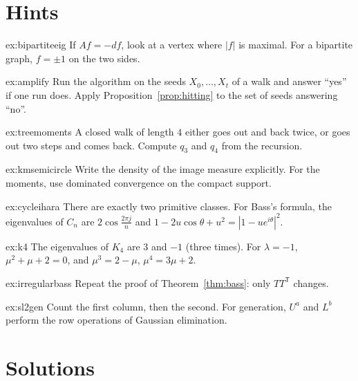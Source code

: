 \section{Hints}

\begin{hint}{ex:bipartiteeig}
If $Af=-df$, look at a vertex where $|f|$ is maximal. For a bipartite graph, $f=\pm1$ on the two sides.
\end{hint}

\begin{hint}{ex:amplify}
Run the algorithm on the seeds $X_0,\dots,X_t$ of a walk and answer ``yes'' if one run does. Apply Proposition~\ref{prop:hitting} to the set of seeds answering ``no''.
\end{hint}

\begin{hint}{ex:treemoments}
A closed walk of length $4$ either goes out and back twice, or goes out two steps and comes back. Compute $q_3$ and $q_4$ from the recursion.
\end{hint}

\begin{hint}{ex:kmsemicircle}
Write the density of the image measure explicitly. For the moments, use dominated convergence on the compact support.
\end{hint}

\begin{hint}{ex:cycleihara}
There are exactly two primitive classes. For Bass's formula, the eigenvalues of $C_n$ are $2\cos\frac{2\pi j}n$ and $1-2u\cos\theta+u^2=|1-ue^{i\theta}|^2$.
\end{hint}

\begin{hint}{ex:k4}
The eigenvalues of $K_4$ are $3$ and $-1$ (three times). For $\lambda=-1$, $\mu^2+\mu+2=0$, and $\mu^3=2-\mu$, $\mu^4=3\mu+2$.
\end{hint}

\begin{hint}{ex:irregularbass}
Repeat the proof of Theorem~\ref{thm:bass}: only $TT^{\mathsf T}$ changes.
\end{hint}

\begin{hint}{ex:sl2gen}
Count the first column, then the second. For generation, $U^a$ and $L^b$ perform the row operations of Gaussian elimination.
\end{hint}

\section{Solutions}


